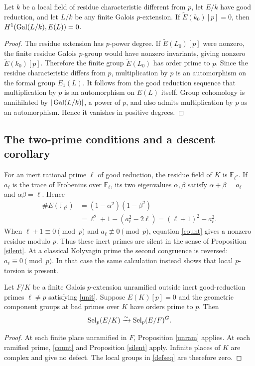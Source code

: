 \documentclass[11pt,a4paper]{article}
\numberwithin{equation}{section}
\begin{document}
\begin{proposition}\label{silent}
Let $k$ be a local field of residue characteristic different from $p$, let $E/k$ have good reduction, and let $L/k$ be any finite Galois $p$-extension. If $\widetilde E(k_0)[p]=0$, then $H^1(\operatorname{Gal}(L/k),E(L))=0$.
\end{proposition}
\begin{proof}
The residue extension has $p$-power degree. If $\widetilde E(L_0)[p]$ were nonzero, the finite residue Galois $p$-group would have nonzero invariants, giving nonzero $\widetilde E(k_0)[p]$. Therefore the finite group $\widetilde E(L_0)$ has order prime to $p$. Since the residue characteristic differs from $p$, multiplication by $p$ is an automorphism on the formal group $E_1(L)$. It follows from the good reduction sequence that multiplication by $p$ is an automorphism on $E(L)$ itself. Group cohomology is annihilated by $|\operatorname{Gal}(L/k)|$, a power of $p$, and also admits multiplication by $p$ as an automorphism. Hence it vanishes in positive degrees.
\end{proof}
\subsection{The two-prime conditions and a descent corollary}
For an inert rational prime $\ell$ of good reduction, the residue field of $K$ is $\mathbb F_{\ell^2}$. If $a_\ell$ is the trace of Frobenius over $\mathbb F_\ell$, its two eigenvalues $\alpha,\beta$ satisfy $\alpha+\beta=a_\ell$ and $\alpha\beta=\ell$. Hence
\begin{equation}\label{count}
\begin{aligned}
\#E(\mathbb F_{\ell^2})&=(1-\alpha^2)(1-\beta^2)\\
&=\ell^2+1-(a_\ell^2-2\ell)=(\ell+1)^2-a_\ell^2.
\end{aligned}
\end{equation}
When $\ell+1\equiv0\pmod p$ and $a_\ell\not\equiv0\pmod p$, equation \eqref{count} gives a nonzero residue modulo $p$. Thus these inert primes are silent in the sense of Proposition \ref{silent}. At a classical Kolyvagin prime the second congruence is reversed: $a_\ell\equiv0\pmod p$. In that case the same calculation instead shows that local $p$-torsion is present.
\begin{corollary}\label{localcor}
Let $F/K$ be a finite Galois $p$-extension unramified outside inert good-reduction primes $\ell\ne p$ satisfying \eqref{unit}. Suppose $E(K)[p]=0$ and the geometric component groups at bad primes over $K$ have orders prime to $p$. Then
\begin{equation}\label{exactdescent}
\operatorname{Sel}_p(E/K)\xrightarrow{\sim}\operatorname{Sel}_p(E/F)^G.
\end{equation}
\end{corollary}
\begin{proof}
At each finite place unramified in $F$, Proposition \ref{unram} applies. At each ramified prime, \eqref{count} and Proposition \ref{silent} apply. Infinite places of $K$ are complex and give no defect. The local groups in \eqref{defseq} are therefore zero.
\end{proof}
\end{document}
